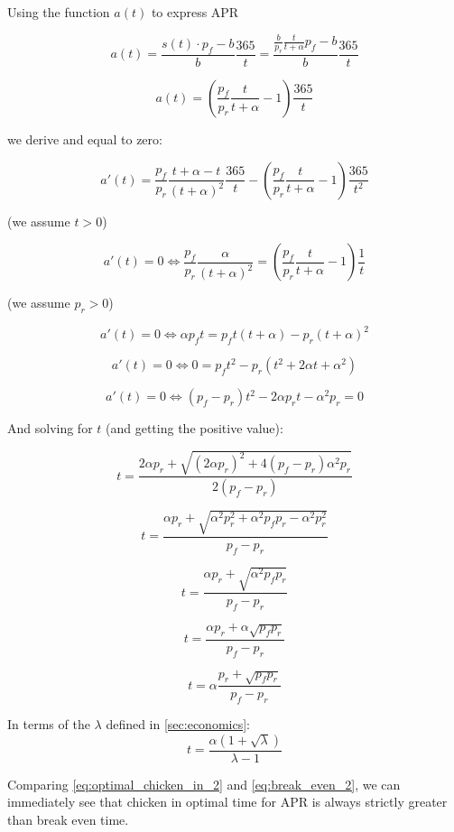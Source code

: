 \documentclass{article}
\begin{document}
Using the function $a(t)$ to express APR

\[
a(t) = \frac{s(t) \cdot p_f - b}{b} \frac{365}{t} = \frac{\frac{b}{p_r} \frac{t}{t+\alpha} p_f - b}{b} \frac{365}{t}
\]

\begin{equation}
  \label{eq:apr}
a(t) = \left(\frac{p_f}{p_r} \frac{t}{t+\alpha} - 1\right) \frac{365}{t}
\end{equation}

we derive and equal to zero:

\[
a'(t) = \frac{p_f}{p_r} \frac{t + \alpha - t}{(t+\alpha)^2} \frac{365}{t} - \left(\frac{p_f}{p_r} \frac{t}{t+\alpha} - 1\right) \frac{365}{t^2}
\]

(we assume $t > 0$)

\[
a'(t) = 0 \iff \frac{p_f}{p_r} \frac{\alpha}{(t+\alpha)^2} = \left(\frac{p_f}{p_r} \frac{t}{t+\alpha} - 1\right) \frac{1}{t}
\]

(we assume $p_r > 0$)

\[
a'(t) = 0 \iff \alpha p_f t = p_f t(t+\alpha)  - p_r(t+\alpha)^2
\]

\[
a'(t) = 0 \iff 0 = p_f t^2 - p_r(t^2+2\alpha t+\alpha^2)
\]

\[
a'(t) = 0 \iff (p_f-p_r)t^2  - 2\alpha p_r t - \alpha^2 p_r = 0
\]

And solving for $t$ (and getting the positive value):

\[
t = \frac{2\alpha p_r + \sqrt{(2\alpha p_r)^2 + 4(p_f-p_r) \alpha^2 p_r}}{2(p_f-p_r)}
\]

\[
t = \frac{\alpha p_r + \sqrt{\alpha^2 p_r^2 + \alpha^2 p_f p_r- \alpha^2 p_r^2}}{p_f-p_r}
\]

\[
t = \frac{\alpha p_r + \sqrt{\alpha^2 p_f p_r}}{p_f-p_r}
\]

\[
t = \frac{\alpha p_r + \alpha \sqrt{p_f p_r}}{p_f-p_r}
\]

\begin{equation}
  \label{eq:optimal_chicken_in_1}
t = \alpha \frac{p_r + \sqrt{p_f p_r}}{p_f-p_r}
\end{equation}

In terms of the $\lambda$ defined in \ref{sec:economics}:
\begin{equation}
  \label{eq:optimal_chicken_in_2}
t = \frac{\alpha \left(1 + \sqrt{\lambda} \right)}{\lambda - 1}
\end{equation}

Comparing \ref{eq:optimal_chicken_in_2} and \ref{eq:break_even_2}, we can immediately see that chicken in optimal time for APR is always strictly greater than break even time.
\end{document}
